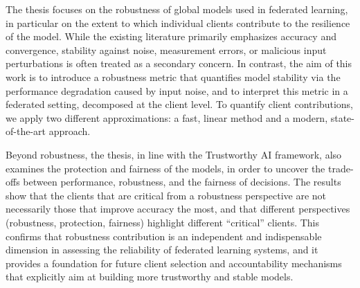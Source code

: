 The thesis focuses on the robustness of global models used in federated learning, in particular on the extent to which individual clients contribute to the resilience of the model. While the existing literature primarily emphasizes accuracy and convergence, stability against noise, measurement errors, or malicious input perturbations is often treated as a secondary concern. In contrast, the aim of this work is to introduce a robustness metric that quantifies model stability via the performance degradation caused by input noise, and to interpret this metric in a federated setting, decomposed at the client level. To quantify client contributions, we apply two different approximations: a fast, linear method and a modern, state-of-the-art approach.

Beyond robustness, the thesis, in line with the Trustworthy AI framework, also examines the protection and fairness of the models, in order to uncover the trade-offs between performance, robustness, and the fairness of decisions. The results show that the clients that are critical from a robustness perspective are not necessarily those that improve accuracy the most, and that different perspectives (robustness, protection, fairness) highlight different “critical” clients. This confirms that robustness contribution is an independent and indispensable dimension in assessing the reliability of federated learning systems, and it provides a foundation for future client selection and accountability mechanisms that explicitly aim at building more trustworthy and stable models.


\vfill
\selectthesislanguage

\setcounter{romanPage}{\value{page}}
